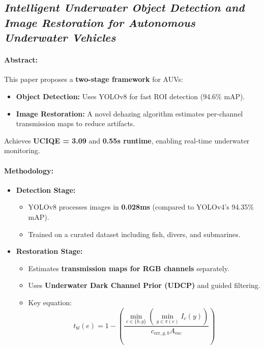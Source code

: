 \subsection{\textit{Intelligent Underwater Object Detection and Image Restoration for Autonomous Underwater Vehicles}\cite{Fayaz_2023}}

\paragraph{Abstract:}
This paper proposes a \textbf{two-stage framework} for AUVs:
\begin{itemize}
    \item \textbf{Object Detection:} Uses YOLOv8 for fast ROI detection (94.6\% mAP).
    \item \textbf{Image Restoration:} A novel dehazing algorithm estimates per-channel transmission maps to reduce artifacts.
\end{itemize}
Achieves \textbf{UCIQE = 3.09} and \textbf{0.55s runtime}, enabling real-time underwater monitoring.

\paragraph{Methodology:}
\begin{itemize}
    \item \textbf{Detection Stage:}
          \begin{itemize}
              \item YOLOv8 processes images in \textbf{0.028ms} (compared to YOLOv4’s 94.35\% mAP).
              \item Trained on a curated dataset including fish, divers, and submarines.
          \end{itemize}

    \item \textbf{Restoration Stage:}
          \begin{itemize}
              \item Estimates \textbf{transmission maps for RGB channels} separately.
              \item Uses \textbf{Underwater Dark Channel Prior (UDCP)} and guided filtering.
              \item Key equation:
                    \[
                        t_{bl}(e) = 1 - \left( \frac{\min_{c \in \{b,g\}}(\min_{y \in \pi(e)} I_c(y))}{c_{\text{err},g,b} A_{mc}} \right)
                    \]
          \end{itemize}
\end{itemize}

